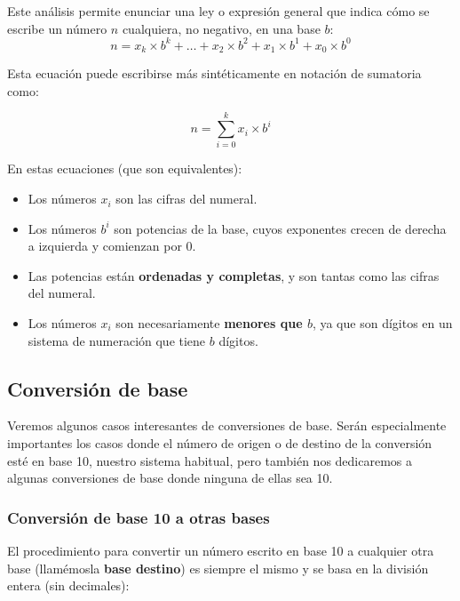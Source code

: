 \documentclass[spanish,a4paper,]{article}
\providecommand{\tightlist}{%
  \setlength{\itemsep}{0pt}\setlength{\parskip}{0pt}}
\begin{document}
Este análisis permite enunciar una ley o expresión general que indica
cómo se escribe un número \(n\) cualquiera, no negativo, en una base
\(b\):
\[n = x_{k} \times b^k + \ldots + x_{2} \times b^{2} + x_1 \times b^1 +x_{0} \times b^0\]

Esta ecuación puede escribirse más sintéticamente en notación de
sumatoria como:

\[n = \sum_{i=0}^{k}{x_i \times b^i}\]

En estas ecuaciones (que son equivalentes):

\begin{itemize}
\tightlist
\item
  Los números \(x_i\) son las cifras del numeral.
\item
  Los números \(b^i\) son potencias de la base, cuyos exponentes crecen
  de derecha a izquierda y comienzan por 0.
\item
  Las potencias están \textbf{ordenadas y completas}, y son tantas como
  las cifras del numeral.
\item
  Los números \(x_i\) son necesariamente \textbf{menores que \(b\)}, ya
  que son dígitos en un sistema de numeración que tiene \(b\) dígitos.
\end{itemize}

\hypertarget{conversiuxf3n-de-base}{%
\subsection{Conversión de base}\label{conversiuxf3n-de-base}}

Veremos algunos casos interesantes de conversiones de base. Serán
especialmente importantes los casos donde el número de origen o de
destino de la conversión esté en base 10, nuestro sistema habitual, pero
también nos dedicaremos a algunas conversiones de base donde ninguna de
ellas sea 10.

\hypertarget{conversiuxf3n-de-base-10-a-otras-bases}{%
\subsubsection{Conversión de base 10 a otras
bases}\label{conversiuxf3n-de-base-10-a-otras-bases}}

El procedimiento para convertir un número escrito en base 10 a cualquier
otra base (llamémosla \textbf{base destino}) es siempre el mismo y se
basa en la división entera (sin decimales):
\end{document}
